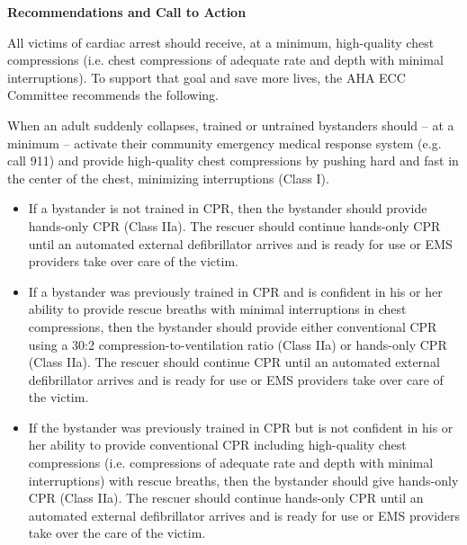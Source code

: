 \vskip 10pt {\narrower \noindent \baselineskip5pt

\noindent
{\bf Recommendations and Call to Action}

\vskip 5pt

All victims of cardiac arrest should receive, at a minimum, high-quality chest compressions (i.e. chest compressions of adequate rate and depth with minimal interruptions). To support that goal and save more lives, the AHA ECC Committee recommends the following. 

\vskip 5pt

When an adult suddenly collapses, trained or untrained bystanders should -- at a minimum -- activate their community emergency medical response system (e.g. call 911) and provide high-quality chest compressions by pushing hard and fast in the center of the chest, minimizing interruptions (Class I).

\begin{itemize}
\item{} If a bystander is not trained in CPR, then the bystander should provide hands-only CPR (Class IIa). The rescuer should continue hands-only CPR until an automated external defibrillator arrives and is ready for use or EMS providers take over care of the victim. 
\vskip 5pt
\item{} If a bystander was previously trained in CPR and is confident in his or her ability to provide rescue breaths with minimal interruptions in chest compressions, then the bystander should provide either conventional CPR using a 30:2 compression-to-ventilation ratio (Class IIa) or hands-only CPR (Class IIa). The rescuer should continue CPR until an automated external defibrillator arrives and is ready for use or EMS providers take over care of the victim. 
\vskip 5pt
\item{} If the bystander was previously trained in CPR but is not confident in his or her ability to provide conventional CPR including high-quality chest compressions (i.e. compressions of adequate rate and depth with minimal interruptions) with rescue breaths, then the bystander should give hands-only CPR (Class IIa). The rescuer should continue hands-only CPR until an automated external defibrillator arrives and is ready for use or EMS providers take over the care of the victim.
\end{itemize}


\par} \vskip 10pt




